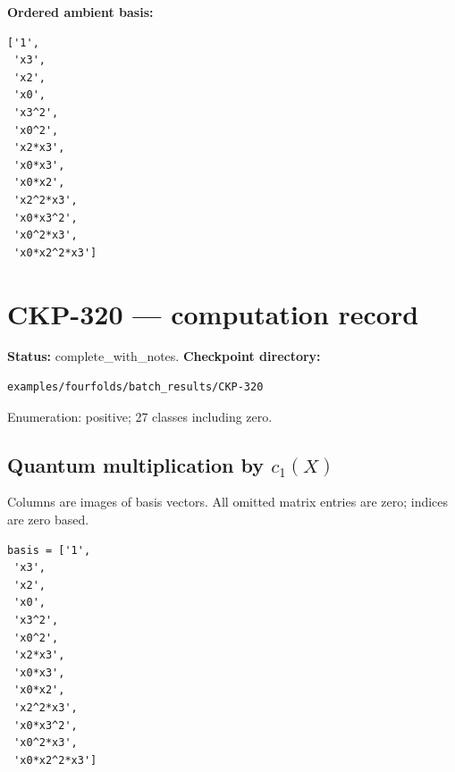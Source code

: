 \documentclass[10pt,a4paper]{article}
\begin{document}
\textbf{Ordered ambient basis:}
\begin{lstlisting}
['1',
 'x3',
 'x2',
 'x0',
 'x3^2',
 'x0^2',
 'x2*x3',
 'x0*x3',
 'x0*x2',
 'x2^2*x3',
 'x0*x3^2',
 'x0^2*x3',
 'x0*x2^2*x3']
\end{lstlisting}

\clearpage\section*{CKP-320 --- computation record}
\textbf{Status:} complete\_with\_notes.
\textbf{Checkpoint directory:}
\begin{lstlisting}
examples/fourfolds/batch_results/CKP-320
\end{lstlisting}

Enumeration: positive; 27 classes including zero.
\subsection*{Quantum multiplication by $c_1(X)$}
Columns are images of basis vectors. All omitted matrix entries are zero; indices are zero based.

\begin{lstlisting}
basis = ['1',
 'x3',
 'x2',
 'x0',
 'x3^2',
 'x0^2',
 'x2*x3',
 'x0*x3',
 'x0*x2',
 'x2^2*x3',
 'x0*x3^2',
 'x0^2*x3',
 'x0*x2^2*x3']
\end{lstlisting}
\end{document}
